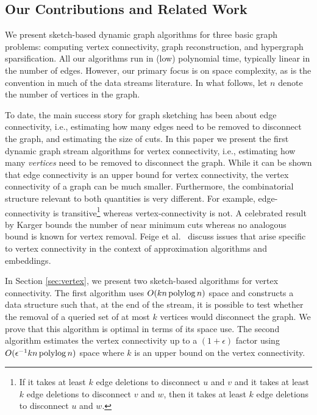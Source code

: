 \subsection{Our Contributions and Related Work}
We present sketch-based dynamic graph algorithms for three basic graph problems: computing vertex connectivity, graph reconstruction, and hypergraph sparsification. All our algorithms run in (low) polynomial time, typically linear in the number of edges. However, our primary focus is on space complexity, as is the convention in much of the data streams literature. In what follows, let $n$ denote the number of vertices in the graph.

 To date, the main success story for graph sketching has been  about edge connectivity, i.e., estimating how many edges need to be removed to disconnect the graph, and estimating the size of cuts. In this paper we present the first dynamic graph stream algorithms for vertex connectivity, i.e., estimating how many \emph{vertices} need to be removed to disconnect the graph. While it can be shown that edge connectivity is an upper bound for vertex connectivity, the vertex connectivity of a graph can be much smaller. Furthermore, the combinatorial structure relevant to both quantities is very different. For example, edge-connectivity is transitive\footnote{If it takes at least $ k$ edge deletions to disconnect $u$ and $v$ and it takes at least $ k$ edge deletions to disconnect $v$ and $w$, then it takes at least $ k$ edge deletions to disconnect $u$ and $w$.} whereas vertex-connectivity is not. A celebrated result by Karger \cite{karger1994} bounds the number of near minimum cuts whereas no analogous bound is known for vertex removal.  Feige et al.~\cite{FeigeHL05} discuss issues that arise specific to vertex connectivity in the context of approximation algorithms and embeddings.


In Section \ref{sec:vertex}, we present two sketch-based algorithms for vertex connectivity. The first algorithm uses $O(kn\operatorname{polylog} n)$ space and constructs a data structure such that, at the end of the stream, it is possible to test whether the removal of a queried set of at most $k$ vertices would disconnect the graph. We  prove that this algorithm is optimal in terms of its space use. The second algorithm estimates the vertex connectivity up to a  $(1+\epsilon)$ factor using $O(\epsilon^{-1} kn\operatorname{polylog} n)$ space where $k$ is an upper bound on the vertex connectivity. 

